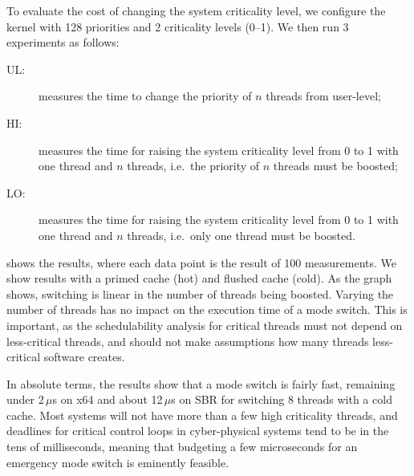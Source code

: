 To evaluate the cost of changing the system criticality level, we
configure the kernel with 128 priorities and 2 criticality levels
(0--1). We then  run 3 experiments as follows:
\iffalse                        %
\begin{itemize}
\item \textbf{UL:} measures the time to change the priority of $n$ threads from user-level;
\item \textbf{HI:} measures the time for raising the system criticality level from 0 to 1 with one \crit{low} thread and $n$
    \crit{high} threads, i.e.\ threads whose priority must be boosted upon criticality switch,
\item \textbf{LO:} measures the time for raising the system criticality level from 0 to 1 with one \crit{high} thread and
 } threads, whose priority does not need to be boosted.
\end{itemize}
\else                           %
\begin{description}
\item[UL:] measures the time to change the priority of $n$ threads from user-level;
\item[HI:] measures the time for raising the system criticality level from 0 to 1 with one  thread and $n$
     threads, i.e.\ the priority of $n$ threads must be boosted;
\item[LO:] measures the time for raising the system criticality level from 0 to 1 with one  thread and
    $n$  threads, i.e.\ only one thread must be boosted.
\end{description}
\fi

 shows the results, where each data point is the result of 100 measurements.
We show results with a primed cache (hot) and flushed cache (cold).
As the graph shows, switching is linear in the number of  threads being boosted. Varying the number
of  threads has no impact on the execution time of a mode switch.
This is important, as the schedulability analysis for critical threads
must not depend on less-critical threads, and should not make
assumptions how many threads less-critical software creates.

In absolute terms, the results show that a mode switch is fairly fast,
remaining under 2\,$\mu$s on x64 and about 12\,\(\mu\)s on SBR for switching 8 threads
with a cold cache. Most systems will not have more than a few high
criticality threads, and deadlines for critical control loops in
cyber-physical systems tend to be in the tens of milliseconds, meaning
that budgeting a few microseconds for an emergency mode switch is eminently
feasible.

